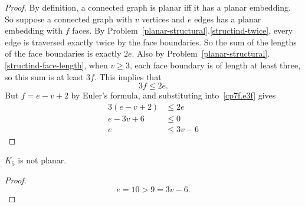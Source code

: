 \documentclass[handout]{mcs}
\begin{document}
\begin{proof}
By definition, a connected graph is planar iff it has a planar embedding.
So suppose a connected graph with $v$ vertices and $e$ edges has a planar
embedding with $f$ faces.  By
Problem~\ref{planar-structural}.\ref{structind-twice}, every edge is traversed
exactly twice by the face boundaries.  So the sum of the lengths of the
face boundaries is exactly $2e$.  Also by
Problem~\ref{planar-structural}.\ref{structind-face-length}, when $v \geq 3$, each
face boundary is of length at least three, so this sum is at least $3f$.
This implies that
\begin{equation}\label{cp7f.e3f}
3f \leq 2e.
\end{equation}
But $f = e-v+2$ by Euler's formula, and substituting into~\eqref{cp7f.e3f} gives
\begin{align*}
3(e-v+2) & \leq 2e\\
e-3v + 6  & \leq 0\\
e & \leq 3v - 6
\end{align*}
\end{proof}

\begin{corollary}
$K_5$ is not planar.
\end{corollary}

\begin{proof}
\[
e = 10 > 9 = 3v-6.
\]
\end{proof}
\iffalse
\end{document}
